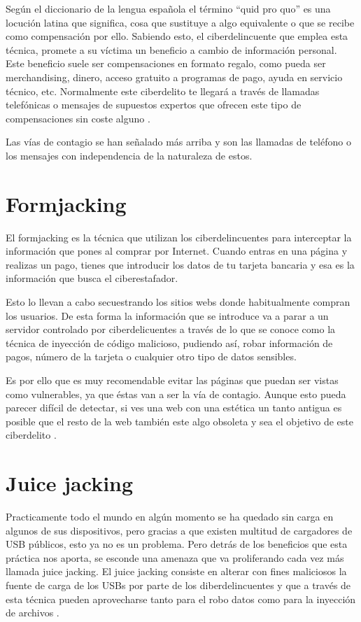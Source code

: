 \documentclass[
  spanish,
  a4paper,
  openany]{book}
\begin{document}
Según el diccionario de la lengua española el término ``quid pro quo'' es una locución latina que significa, cosa que sustituye a algo equivalente o que se recibe como compensación por ello. Sabiendo esto, el ciberdelincuente que emplea esta técnica, promete a su víctima un beneficio a cambio de información personal. Este beneficio suele ser compensaciones en formato regalo, como pueda ser merchandising, dinero, acceso gratuito a programas de pago, ayuda en servicio técnico, etc. Normalmente este ciberdelito te llegará a través de llamadas telefónicas o mensajes de supuestos expertos que ofrecen este tipo de compensaciones sin coste alguno \citep{quid-pro-quo}.

Las vías de contagio se han señalado más arriba y son las llamadas de teléfono o los mensajes con independencia de la naturaleza de estos.

\hypertarget{formjacking}{%
\section{Formjacking}\label{formjacking}}

El formjacking es la técnica que utilizan los ciberdelincuentes para interceptar la información que pones al comprar por Internet. Cuando entras en una página y realizas un pago, tienes que introducir los datos de tu tarjeta bancaria y esa es la información que busca el ciberestafador.

Esto lo llevan a cabo secuestrando los sitios webs donde habitualmente compran los usuarios. De esta forma la información que se introduce va a parar a un servidor controlado por ciberdelicuentes a través de lo que se conoce como la técnica de inyección de código malicioso, pudiendo así, robar información de pagos, número de la tarjeta o cualquier otro tipo de datos sensibles.

Es por ello que es muy recomendable evitar las páginas que puedan ser vistas como vulnerables, ya que éstas van a ser la vía de contagio. Aunque esto pueda parecer difícil de detectar, si ves una web con una estética un tanto antigua es posible que el resto de la web también este algo obsoleta y sea el objetivo de este ciberdelito \citep{RZ-formjacking}.

\hypertarget{juice-jacking}{%
\section{Juice jacking}\label{juice-jacking}}

Practicamente todo el mundo en algún momento se ha quedado sin carga en algunos de sus dispositivos, pero gracias a que existen multitud de cargadores de USB públicos, esto ya no es un problema. Pero detrás de los beneficios que esta práctica nos aporta, se esconde una amenaza que va proliferando cada vez más llamada juice jacking. El juice jacking consiste en alterar con fines maliciosos la fuente de carga de los USBs por parte de los diberdelincuentes y que a través de esta técnica pueden aprovecharse tanto para el robo datos como para la inyección de archivos \citep{ESET-juice-jacking}.
\end{document}
